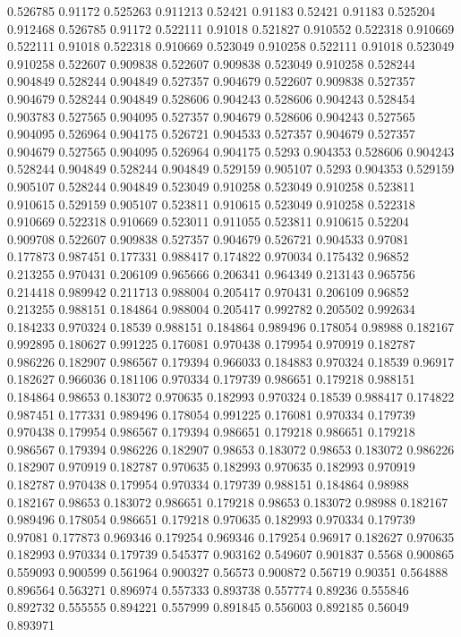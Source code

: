 0.526785 0.91172
0.525263 0.911213
0.52421 0.91183
0.52421 0.91183
0.525204 0.912468
0.526785 0.91172
0.522111 0.91018
0.521827 0.910552
0.522318 0.910669
0.522111 0.91018
0.522318 0.910669
0.523049 0.910258
0.522111 0.91018
0.523049 0.910258
0.522607 0.909838
0.522607 0.909838
0.523049 0.910258
0.528244 0.904849
0.528244 0.904849
0.527357 0.904679
0.522607 0.909838
0.527357 0.904679
0.528244 0.904849
0.528606 0.904243
0.528606 0.904243
0.528454 0.903783
0.527565 0.904095
0.527357 0.904679
0.528606 0.904243
0.527565 0.904095
0.526964 0.904175
0.526721 0.904533
0.527357 0.904679
0.527357 0.904679
0.527565 0.904095
0.526964 0.904175
0.5293 0.904353
0.528606 0.904243
0.528244 0.904849
0.528244 0.904849
0.529159 0.905107
0.5293 0.904353
0.529159 0.905107
0.528244 0.904849
0.523049 0.910258
0.523049 0.910258
0.523811 0.910615
0.529159 0.905107
0.523811 0.910615
0.523049 0.910258
0.522318 0.910669
0.522318 0.910669
0.523011 0.911055
0.523811 0.910615
0.52204 0.909708
0.522607 0.909838
0.527357 0.904679
0.526721 0.904533
0.97081 0.177873
0.987451 0.177331
0.988417 0.174822
0.970034 0.175432
0.96852 0.213255
0.970431 0.206109
0.965666 0.206341
0.964349 0.213143
0.965756 0.214418
0.989942 0.211713
0.988004 0.205417
0.970431 0.206109
0.96852 0.213255
0.988151 0.184864
0.988004 0.205417
0.992782 0.205502
0.992634 0.184233
0.970324 0.18539
0.988151 0.184864
0.989496 0.178054
0.98988 0.182167
0.992895 0.180627
0.991225 0.176081
0.970438 0.179954
0.970919 0.182787
0.986226 0.182907
0.986567 0.179394
0.966033 0.184883
0.970324 0.18539
0.96917 0.182627
0.966036 0.181106
0.970334 0.179739
0.986651 0.179218
0.988151 0.184864
0.98653 0.183072
0.970635 0.182993
0.970324 0.18539
0.988417 0.174822
0.987451 0.177331
0.989496 0.178054
0.991225 0.176081
0.970334 0.179739
0.970438 0.179954
0.986567 0.179394
0.986651 0.179218
0.986651 0.179218
0.986567 0.179394
0.986226 0.182907
0.98653 0.183072
0.98653 0.183072
0.986226 0.182907
0.970919 0.182787
0.970635 0.182993
0.970635 0.182993
0.970919 0.182787
0.970438 0.179954
0.970334 0.179739
0.988151 0.184864
0.98988 0.182167
0.98653 0.183072
0.986651 0.179218
0.98653 0.183072
0.98988 0.182167
0.989496 0.178054
0.986651 0.179218
0.970635 0.182993
0.970334 0.179739
0.97081 0.177873
0.969346 0.179254
0.969346 0.179254
0.96917 0.182627
0.970635 0.182993
0.970334 0.179739
0.545377 0.903162
0.549607 0.901837
0.5568 0.900865
0.559093 0.900599
0.561964 0.900327
0.56573 0.900872
0.56719 0.90351
0.564888 0.896564
0.563271 0.896974
0.557333 0.893738
0.557774 0.89236
0.555846 0.892732
0.555555 0.894221
0.557999 0.891845
0.556003 0.892185
0.56049 0.893971
